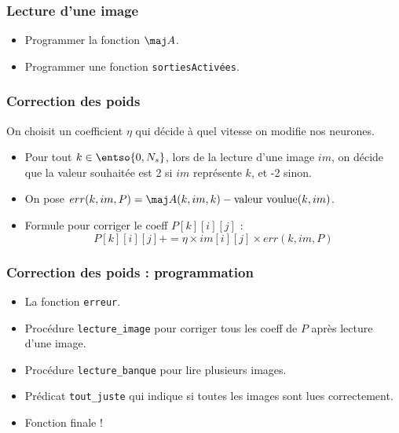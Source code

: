 \documentclass{présentation}
\begin{document}
\begin{frame}\frametitle{Lecture d'une image}

  \begin{itemize}[<+->]
  \item Programmer la fonction $\maj A$.
  \item Programmer une fonction \texttt{sortiesActivées}.
  \end{itemize}
  
\end{frame}



\begin{frame}\frametitle{Correction des poids}

On choisit un coefficient $η$ qui décide à quel vitesse on modifie nos neurones.\pause
  
  \begin{itemize}[<+->]
  \item Pour tout $k\in\entso{0,N_s}$, lors de la lecture d'une image $im$, on décide que la valeur souhaitée est 2 si $im$ représente $k$, et -2 sinon.
  \item On pose $err(k,im,P) = \maj A(k,im,k) - \text{valeur voulue}(k,im)$.
    
  \item Formule pour corriger le coeff $P[k][i][j]$ :
    \[ P[k][i][j] += η× im[i][j]×err(k,im,P) \]
  \end{itemize}
  
\end{frame}

\begin{frame}\frametitle{Correction des poids : programmation}

  \begin{itemize}[<+->]
  \item La fonction \texttt{erreur}.
  \item Procédure \texttt{lecture\_image} pour corriger tous les coeff de $P$ après lecture d'une image.
  \item Procédure \texttt{lecture\_banque} pour lire plusieurs images.
  \item Prédicat \texttt{tout\_juste} qui indique si toutes les images sont lues correctement.
  \item Fonction finale !
  \end{itemize}
\end{frame}
\end{document}
